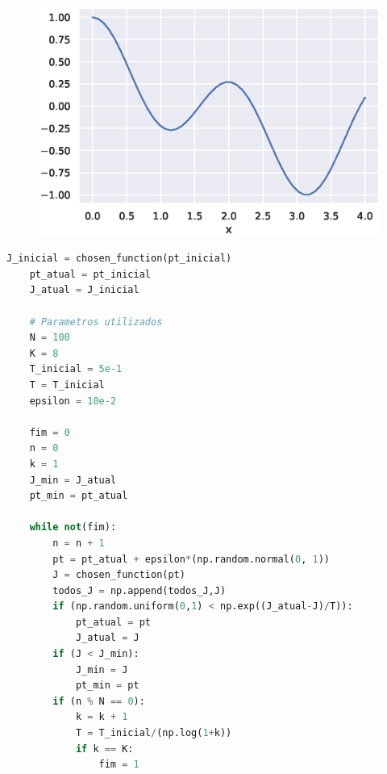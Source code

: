 \documentclass{homeworkclass}
\begin{document}
\begin{figure}[!h]
	\centering
	\includegraphics[width=0.7\linewidth]{figs/cos}
\end{figure}
\pagebreak
\begin{lstlisting}[language=Python]
	J_inicial = chosen_function(pt_inicial)
	pt_atual = pt_inicial
	J_atual = J_inicial

	# Parametros utilizados
	N = 100
	K = 8
	T_inicial = 5e-1
	T = T_inicial
	epsilon = 10e-2

	fim = 0
	n = 0
	k = 1
	J_min = J_atual
	pt_min = pt_atual

	while not(fim):
		n = n + 1
		pt = pt_atual + epsilon*(np.random.normal(0, 1))
		J = chosen_function(pt)
		todos_J = np.append(todos_J,J)
		if (np.random.uniform(0,1) < np.exp((J_atual-J)/T)):
			pt_atual = pt
			J_atual = J
		if (J < J_min):
			J_min = J
			pt_min = pt
		if (n % N == 0):
			k = k + 1
			T = T_inicial/(np.log(1+k))
			if k == K:
				fim = 1
\end{lstlisting}
\end{document}
